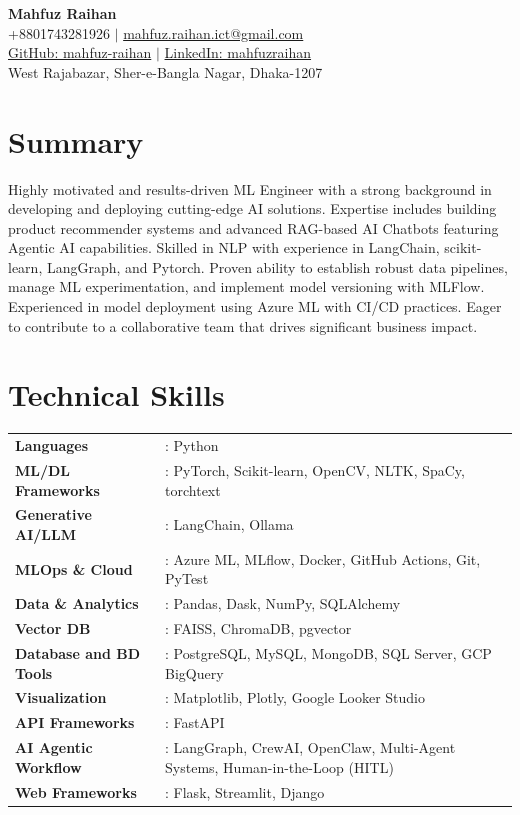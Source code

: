 \documentclass[10pt, a4paper]{article}
\begin{document}
\begin{center}
    {\Huge \bfseries Mahfuz Raihan} \\ \vspace{5pt}
    \small +8801743281926 $|$ \href{mailto:mahfuz.raihan.ict@gmail.com}{mahfuz.raihan.ict@gmail.com} \\
    \href{https://github.com/mahfuz-raihan}{GitHub: mahfuz-raihan} $|$ \href{https://www.linkedin.com/in/mahfuzraihan/}{LinkedIn: mahfuzraihan} \\
    \small West Rajabazar, Sher-e-Bangla Nagar, Dhaka-1207
\end{center}

\section{Summary}
Highly motivated and results-driven ML Engineer with a strong background in developing and deploying cutting-edge AI solutions. Expertise includes building product recommender systems and advanced RAG-based AI Chatbots featuring Agentic AI capabilities. Skilled in NLP with experience in LangChain, scikit-learn, LangGraph, and Pytorch. Proven ability to establish robust data pipelines, manage ML experimentation, and implement model versioning with MLFlow. Experienced in model deployment using Azure ML with CI/CD practices. Eager to contribute to a collaborative team that drives significant business impact.

\section{Technical Skills}
 \begin{itemize}[leftmargin=0.02in, label={}]
    \small{\item{
     \begin{tabular}{@{}p{3.8cm} p{13.4cm}}
      \textbf{Languages} & : Python\\
      \textbf{ML/DL Frameworks} & : PyTorch, Scikit-learn, OpenCV, NLTK, SpaCy, torchtext \\
      \textbf{Generative AI/LLM} & : LangChain, Ollama \\
      \textbf{MLOps \& Cloud} & : Azure ML, MLflow, Docker, GitHub Actions, Git, PyTest \\
      \textbf{Data \& Analytics} & : Pandas, Dask, NumPy, SQLAlchemy \\
      \textbf{Vector DB} & : FAISS, ChromaDB, pgvector \\
      \textbf{Database and BD Tools} & : PostgreSQL, MySQL, MongoDB, SQL Server, GCP BigQuery\\
      \textbf{Visualization} & : Matplotlib, Plotly, Google Looker Studio \\
      \textbf{API Frameworks} & : FastAPI \\
      \textbf{AI Agentic Workflow} & : LangGraph, CrewAI, OpenClaw, Multi-Agent Systems, Human-in-the-Loop (HITL)\\
      \textbf{Web Frameworks} & : Flask, Streamlit, Django\\
     \end{tabular}
    }}
 \end{itemize}
\end{document}
